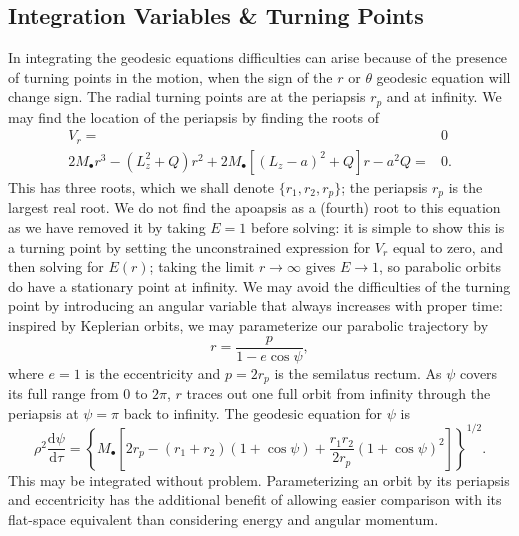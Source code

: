 \documentclass[a4paper, 11pt, titlepage, twoside]{report}
\newcommand{\dd}{\ensuremath{\mathrm{d}}}
\newcommand{\diff}[2]{\ensuremath{\frac{\dd {#1}}{\dd {#2}}}}
\begin{document}
\subsection{Integration Variables \& Turning Points}

In integrating the geodesic equations difficulties can arise because of the presence of turning points in the motion, when the sign of the $r$ or $\theta$ geodesic equation will change sign. The radial turning points are at the periapsis $r_p$ and at infinity. We may find the location of the periapsis by finding the roots of
\begin{align}
V_r = {} & 0 \nonumber \\
2M_\bullet r^3 - \left(L_z^2+Q\right)r^2 + 2M_\bullet\left[\left(L_z - a\right)^2 + Q\right]r - a^2Q= {} & 0.
\end{align}
This has three roots, which we shall denote $\{r_1, r_2, r_p\}$; the periapsis $r_p$ is the largest real root. We do not find the apoapsis as a (fourth) root to this equation as we have removed it by taking $E = 1$ before solving: it is simple to show this is a turning point by setting the unconstrained expression for $V_r$ equal to zero, and then solving for $E(r)$; taking the limit $r \rightarrow \infty$ gives $E \rightarrow 1$, so parabolic orbits do have a stationary point at infinity\cite{Wilkins1972}. We may avoid the difficulties of the turning point by introducing an angular variable that always increases with proper time\cite{Drasco2004}: inspired by Keplerian orbits, we may parameterize our parabolic trajectory by
\begin{equation}
r = \frac{p}{1-e\cos\psi},
\end{equation}
where $e = 1$ is the eccentricity and $p = 2r_p$ is the semilatus rectum. As $\psi$ covers its full range from $0$ to $2\pi$, $r$ traces out one full orbit from infinity through the periapsis at $\psi = \pi$ back to infinity. The geodesic equation for $\psi$ is
\begin{equation}
\rho^2 \diff{\psi}{\tau} = \left\{M_\bullet\left[2r_p - \left(r_1 + r_2\right)\left(1 + \cos\psi\right) + \frac{r_1 r_2}{2r_p}\left(1 + \cos\psi\right)^2\right]\right\}^{1/2}.
\end{equation}
This may be integrated without problem. Parameterizing an orbit by its periapsis and eccentricity has the additional benefit of allowing easier comparison with its flat-space equivalent than considering energy and angular momentum\cite{Gair2005}.
\end{document}
